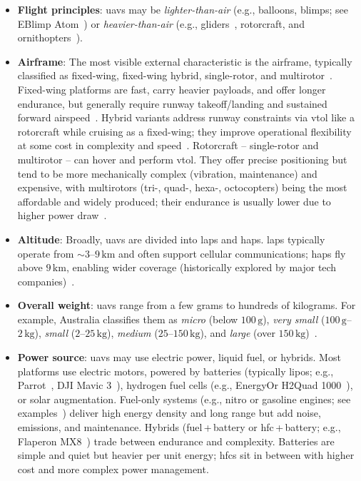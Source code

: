 \begin{itemize}
\item \textbf{Flight principles}: \glspl{uav} may be \emph{lighter-than-air}
  (e.g., balloons, blimps; see EBlimp Atom~\cite{eblimp-atom}) or
  \emph{heavier-than-air} (e.g., gliders~\cite{px4-glider}, rotorcraft, and
  ornithopters~\cite{drone-bird}).

\item \textbf{Airframe}: The most visible external characteristic is the
  airframe, typically classified as fixed-wing, fixed-wing hybrid, single-rotor,
  and multirotor~\cite{mohsan2022towards}. Fixed-wing platforms are fast, carry
  heavier payloads, and offer longer endurance, but generally require runway
  takeoff/landing and sustained forward airspeed~\cite{mohsan2022towards}. Hybrid
  variants address runway constraints via \gls{vtol} like a rotorcraft while
  cruising as a fixed-wing; they improve operational flexibility at some cost in
  complexity and speed~\cite{mohsan2022towards}. Rotorcraft -- single-rotor and
  multirotor -- can hover and perform \gls{vtol}. They offer precise positioning but
  tend to be more mechanically complex (vibration, maintenance) and expensive,
  with multirotors (tri-, quad-, hexa-, octocopters) being the most affordable
  and widely produced; their endurance is usually lower due to higher power
  draw~\cite{mohsan2022towards}.

\item \textbf{Altitude}: Broadly, \glspl{uav} are divided into \glspl{lap} and
  \glspl{hap}. \glspl{lap} typically operate from \(\sim 3\)–\(9\,\mathrm{km}\) and
  often support cellular communications; \glspl{hap} fly above
  \(9\,\mathrm{km}\), enabling wider coverage (historically explored by major
  tech companies)~\cite{mohsan2022towards}.

\item \textbf{Overall weight}: \glspl{uav} range from a few grams to hundreds of
  kilograms. For example, Australia classifies them as \emph{micro} (below
  \(100\,\mathrm{g}\)), \emph{very small} (\(100\,\mathrm{g}\)–\(2\,\mathrm{kg}\)),
  \emph{small} (\(2\)–\(25\,\mathrm{kg}\)), \emph{medium}
  (\(25\)–\(150\,\mathrm{kg}\)), and \emph{large} (over \(150\,\mathrm{kg}\))~\cite{alladi2022UAVBlockain}.

\item \textbf{Power source}: \glspl{uav} may use electric power, liquid fuel, or
  hybrids. Most platforms use electric motors, powered by batteries (typically
  \glspl{lipo}; e.g., Parrot~\cite{parrotDrone}, DJI Mavic 3~\cite{djiMavic3Drone}),
  hydrogen fuel cells (e.g., EnergyOr H2Quad 1000~\cite{energyorDrone}), or solar
  augmentation. Fuel-only systems (e.g., nitro or gasoline engines; see
  examples~\cite{gasPoweredDrone}) deliver high energy density and long range but
  add noise, emissions, and maintenance. Hybrids (fuel\,+\,battery or
  \gls{hfc}\,+\,battery; e.g., Flaperon MX8~\cite{flaperonDrone}) trade between
  endurance and complexity. Batteries are simple and quiet but heavier per unit
  energy; \glspl{hfc} sit in between with higher cost and more complex power
  management.


\end{itemize}

